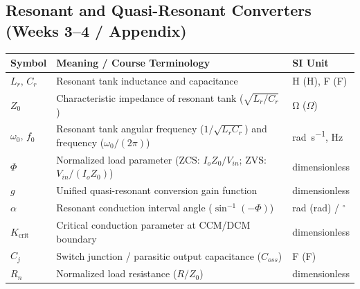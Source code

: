\subsection{Resonant and Quasi-Resonant Converters (Weeks 3--4 / Appendix)}
\begin{center}
\begin{tabular}{@{}lll@{}}
\toprule
\textbf{Symbol} & \textbf{Meaning / Course Terminology} & \textbf{SI Unit} \\
\midrule
$L_r,\, C_r$ & Resonant tank inductance and capacitance & \si{\henry} (H), \si{\farad} (F) \\
$Z_0$ & Characteristic impedance of resonant tank ($\sqrt{L_r/C_r}$) & \si{\ohm} ($\Omega$) \\
$\omega_0,\, f_0$ & Resonant tank angular frequency ($1/\sqrt{L_r C_r}$) and frequency ($\omega_0/(2\pi)$) & \si{\radian\per\second}, \si{\hertz} \\
$\Phi$ & Normalized load parameter (ZCS: $I_o Z_0 / V_{in}$; ZVS: $V_{in} / (I_o Z_0)$) & dimensionless \\
$g$ & Unified quasi-resonant conversion gain function & dimensionless \\
$\alpha$ & Resonant conduction interval angle ($\sin^{-1}(-\Phi)$) & \si{\radian} (rad) / $^\circ$ \\
$K_{\mathrm{crit}}$ & Critical conduction parameter at CCM/DCM boundary & dimensionless \\
$C_j$ & Switch junction / parasitic output capacitance ($C_{oss}$) & \si{\farad} (F) \\
$R_n$ & Normalized load resistance ($R/Z_0$) & dimensionless \\
\bottomrule
\end{tabular}
\end{center}

